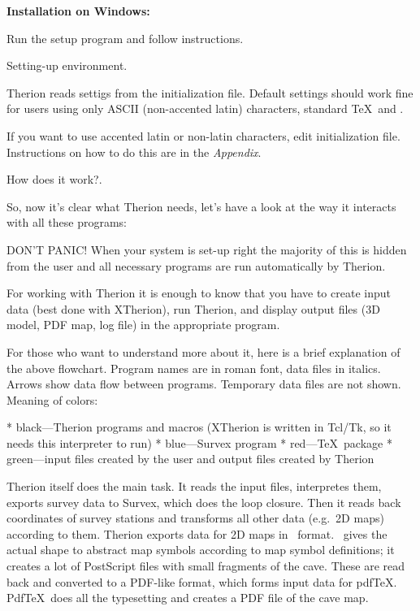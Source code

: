 {\bf Installation on Windows:}

Run the setup program and follow instructions.


\subsubchapter Setting-up environment.

Therion reads settigs from the initialization file. Default settings should 
work fine for users using only ASCII (non-accented latin) characters, 
standard \TeX\ and \MP. 

If you want to use accented latin or non-latin characters, edit initialization 
file. Instructions on how to do this are in the {\it Appendix}.


\subchapter How does it work?.

So, now it's clear what Therion needs, let's have a look at the way 
it interacts with all these programs:


DON'T PANIC! When your system is set-up right the majority of this is hidden from 
the user and all necessary programs are run automatically by Therion. 

For working with Therion it is enough to know that you have to create input data 
(best done with XTherion), run Therion, and display output files 
(3D model, PDF map, log file) in the appropriate program. 

For those who want to understand more about it, here is a brief explanation of 
the above flowchart. Program names are in roman font, data files in italics. 
Arrows show data flow between programs. Temporary data files are not shown. 
Meaning of colors:

\list
* black---Therion programs and macros (XTherion is written in Tcl/Tk,
  so it needs this interpreter to run)
* blue---Survex program
* red---\TeX\ package
* green---input files created by the user and output files created by Therion
\endlist

Therion itself does the main task. It reads the input files, interpretes them, 
exports survey data to Survex, which does the loop closure. Then it reads back 
coordinates of survey stations and transforms all other data (e.g.~2D maps) 
according to them. Therion exports data for 2D maps in \MP\ format. \MP\ gives 
the actual shape to abstract map symbols according to map symbol definitions; it
creates a lot of PostScript files with small fragments of the cave. These are 
read back and converted to a PDF-like format, which forms input data 
for pdf\TeX. Pdf\TeX\ does all the typesetting and creates a PDF file of the cave 
map. 

